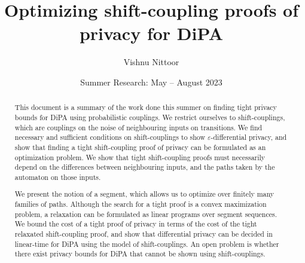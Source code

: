 \documentclass{article}
\renewcommand{\epsilon}{\varepsilon}
\newcommand{\1}{\langle 1 \rangle}
\newcommand{\2}{\langle 2 \rangle}
\begin{document}
\title{Optimizing shift-coupling proofs of privacy for DiPA}
\date{Summer Research: May -- August 2023}
\author{Vishnu Nittoor}

\maketitle

\begin{abstract}
    This document is a summary of the work done this summer on finding tight privacy bounds for DiPA using probabilistic couplings. We restrict ourselves to shift-couplings, which are couplings on the noise of neighbouring inputs on transitions. We find necessary and sufficient conditions on shift-couplings to show $\epsilon$-differential privacy, and show that finding a tight shift-coupling proof of privacy can be formulated as an optimization problem. We show that tight shift-coupling proofs must necessarily depend on the differences between neighbouring inputs, and the paths taken by the automaton on those inputs. 
    
    We present the notion of a segment, which allows us to optimize over finitely many families of paths. Although the search for a tight proof is a convex maximization problem, a relaxation can be formulated as linear programs over segment sequences. We bound the cost of a tight proof of privacy in terms of the cost of the tight relaxated shift-coupling proof, and show that differential privacy can be decided in linear-time for DiPA using the model of shift-couplings. An open problem is whether there exist privacy bounds for DiPA that cannot be shown using shift-couplings.
\end{abstract}
\tableofcontents

\newpage

\end{document}
